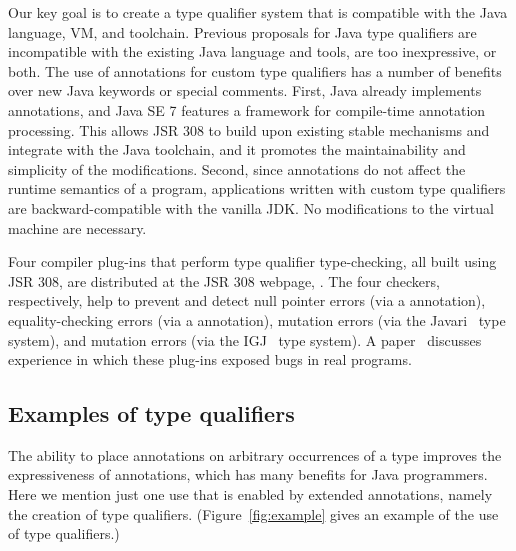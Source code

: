 \documentclass[10pt]{article}
\begin{document}
Our key goal is to create a type qualifier system that is compatible with
the Java language, VM, and toolchain.
Previous proposals
for Java type qualifiers are incompatible with the existing Java language
and tools, are too inexpressive, or both.
The use of annotations for custom type qualifiers has a number of
benefits over new Java keywords or special comments. First, Java
already implements annotations, and Java SE 7 features a framework
for compile-time annotation processing. This allows JSR 308 to
build upon existing stable mechanisms and integrate with the Java
toolchain, and it promotes the maintainability and simplicity of the
modifications. Second, since annotations do not affect the runtime
semantics of a program, applications written with custom type
qualifiers are backward-compatible with the vanilla JDK\@.
No modifications to the virtual machine are necessary.

Four compiler plug-ins that perform type qualifier type-checking, all built
using JSR 308, are distributed at the JSR 308 webpage,
.  The four checkers, respectively,
help to prevent and detect null pointer errors (via a 
annotation), equality-checking errors (via a  annotation),
mutation errors (via the Javari~\cite{BirkaE2004,TschantzE2005} type
system), and mutation errors (via the IGJ~\cite{ZibinPAAKE2007} type
system).  A paper~\cite{PapiACPE2008} discusses experience
in which these plug-ins exposed bugs in real programs.


\subsection{Examples of type qualifiers\label{type-qualifier-examples}}

The ability to place annotations on arbitrary occurrences of a type
improves the expressiveness of annotations, which has many benefits for
Java programmers.  Here we mention just one use that is enabled by extended
annotations, namely the creation of type qualifiers.
(Figure~\ref{fig:example} gives an example of the use of type qualifiers.)
\end{document}
